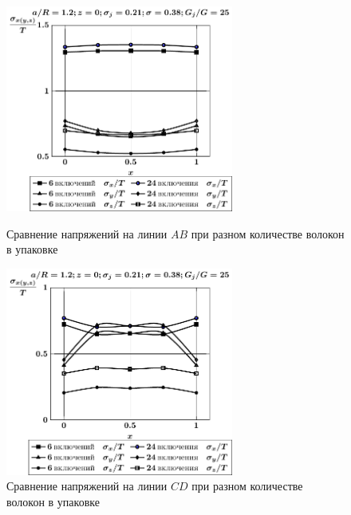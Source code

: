 \begin{figure}[h!]
\centering\footnotesize
\parbox[b]{7.5cm}{\centering\includegraphics[width=7.5cm]{inc24-6-a12-h10-r10-g25-z0.pdf}
\caption{Сравнение напряжений на линии $AB$ при разном количестве волокон в упаковке
\label{f:7:116}}}\hfil\hfil
\parbox[b]{7.5cm}{\centering\includegraphics[width=7.5cm]{inc24-6-a12-h10-r10-g25-z0-diag.pdf}
\caption{Сравнение напряжений на линии $CD$ при разном количестве волокон в упаковке
\label{f:7:117}}}
\end{figure}

